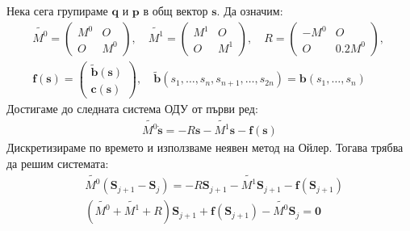\documentclass[bulgarian, 12pt]{article}
\begin{document}
\begin{large}
Нека сега групираме $\mathbf{q}$ и $\mathbf{p}$ в общ вектор $\mathbf{s}$. Да означим:  
\begin{align*}
  &\tilde{M^0}=\left(\begin{array}{c|c}
    M^0 & O \\ \hline
    O & M^0
  \end{array}\right),\quad
  \tilde{M^1}=\left(\begin{array}{c|c}
    M^1 & O \\ \hline
    O & M^1
  \end{array}\right),\quad
  R=\left(\begin{array}{c|c}
    -M^0 & O \\ \hline
    O & 0.2 M^0
  \end{array}\right),\quad \\
  &\mathbf{f}(\mathbf{s}) = \left(\begin{array}{c}
    \tilde{\mathbf{b}}(\mathbf{s}) \\ \hline
    \mathbf{c}(\mathbf{s})
  \end{array}\right),\quad \tilde{\mathbf{b}}(s_1, \dots, s_n, s_{n+1}, \dots, s_{2 n}) = \mathbf{b}(s_1, \dots, s_n)
\end{align*}
Достигаме до следната система ОДУ от първи ред:
\begin{align*}
  \tilde{M^0}\dot{\mathbf{s}} = -R \mathbf{s} -\tilde{M^1} \mathbf{s} -\mathbf{f}(\mathbf{s})
\end{align*}
Дискретизираме по времето и използваме неявен метод на Ойлер. Тогава трябва да решим системата:
\begin{align*}
  &\tilde{M^0}(\mathbf{S}_{j+1} - \mathbf{S}_j) = -R \mathbf{S}_{j+1} -\tilde{M^1} \mathbf{S}_{j+1} -\mathbf{f}(\mathbf{S}_{j+1}) \\
  &(\tilde{M^0}+\tilde{M^1}+R)\mathbf{S}_{j+1} + \mathbf{f}(\mathbf{S}_{j+1}) - \tilde{M^0}\mathbf{S}_j = \mathbf{0}
\end{align*}
\end{large}
\end{document}
